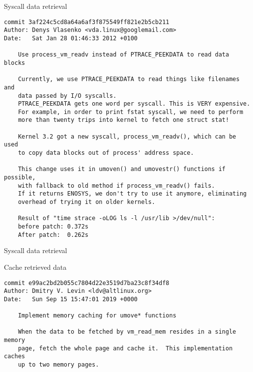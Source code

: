 \documentclass[unicode,aspectratio=169]{beamer}
\begin{document}
\begin{frame}[fragile]{Syscall data retrieval}
\begin{block}{}
\begin{scriptsize}
\begin{verbatim}
commit 3af224c5cd8a64a6af3f875549ff821e2b5cb211
Author: Denys Vlasenko <vda.linux@googlemail.com>
Date:   Sat Jan 28 01:46:33 2012 +0100

    Use process_vm_readv instead of PTRACE_PEEKDATA to read data blocks
    
    Currently, we use PTRACE_PEEKDATA to read things like filenames and
    data passed by I/O syscalls.
    PTRACE_PEEKDATA gets one word per syscall. This is VERY expensive.
    For example, in order to print fstat syscall, we need to perform
    more than twenty trips into kernel to fetch one struct stat!
    
    Kernel 3.2 got a new syscall, process_vm_readv(), which can be used
    to copy data blocks out of process' address space.
    
    This change uses it in umoven() and umovestr() functions if possible,
    with fallback to old method if process_vm_readv() fails.
    If it returns ENOSYS, we don't try to use it anymore, eliminating
    overhead of trying it on older kernels.
    
    Result of "time strace -oLOG ls -l /usr/lib >/dev/null":
    before patch: 0.372s
    After patch:  0.262s
\end{verbatim}
\end{scriptsize}
\end{block}
\end{frame}

\begin{frame}[fragile]{Syscall data retrieval}
\begin{block}{\large Cache retrieved data}
\begin{scriptsize}
\begin{verbatim}
commit e99ac2bd2b055c7804d22e3519d7ba23c8f34df8
Author: Dmitry V. Levin <ldv@altlinux.org>
Date:   Sun Sep 15 15:47:01 2019 +0000

    Implement memory caching for umove* functions
    
    When the data to be fetched by vm_read_mem resides in a single memory
    page, fetch the whole page and cache it.  This implementation caches
    up to two memory pages.
\end{verbatim}
\end{scriptsize}
\end{block}
\end{frame}
\end{document}
